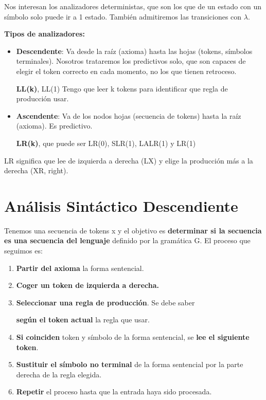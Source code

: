 \documentclass[12pt, twoside, openright]{report} %
\begin{document}
Nos interesan los analizadores deterministas, que son los que de un
estado con un símbolo solo puede ir a 1 estado. También admitiremos las
transiciones con \(\lambda\).

\textbf{Tipos de analizadores:}

\begin{itemize}
\item \textbf{Descendente}: Va desde la raíz (axioma) hasta las hojas
  (tokens, símbolos terminales). Nosotros trataremos los predictivos
  solo, que son capaces de elegir el token correcto en cada momento, no
  los que tienen retroceso.

  \textbf{LL(k)}, LL(1) Tengo que leer k tokens para identificar que
  regla de producción usar.
\item \textbf{Ascendente}: Va de los nodos hojas (secuencia de tokens) hasta
  la raíz (axioma). Es predictivo.

  \textbf{LR(k)}, que puede ser LR(0), SLR(1), LALR(1) y LR(1)
\end{itemize}

LR significa que lee de izquierda a derecha (LX) y elige la producción
más a la derecha (XR, right).

\section{Análisis Sintáctico Descendiente}

Tenemos una secuencia de tokens x y el objetivo es \textbf{determinar si
la secuencia es una secuencia del lenguaje} definido por la gramática G.
El proceso que seguimos es:

\begin{enumerate}
\def\labelenumi{\arabic{enumi}.}

\item
  \textbf{Partir del axioma} la forma sentencial.
\item
  \textbf{Coger un token de izquierda a derecha.}
\item
  \textbf{Seleccionar una regla de producción}. Se debe saber
  
  \textbf{según el token actual} la regla que usar.
\item
  \textbf{Si coinciden} token y símbolo de la forma sentencial, se
  \textbf{lee el siguiente token}.
\item
  \textbf{Sustituir el símbolo no terminal} de la forma sentencial por
  la parte derecha de la regla elegida.
\item
  \textbf{Repetir} el proceso hasta que la entrada haya sido procesada.
\end{enumerate}
\end{document}
